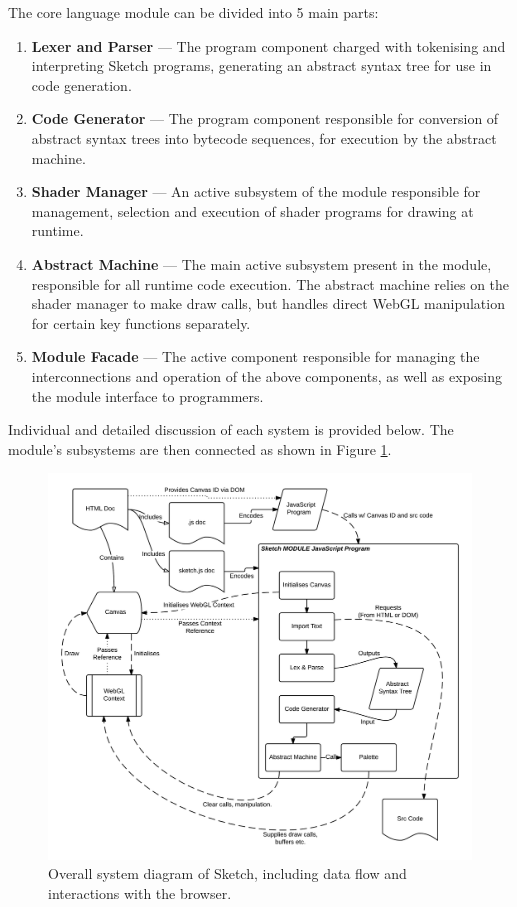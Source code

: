 \documentclass{l3proj}
\begin{document}
The core language module can be divided into 5 main parts:
\begin{enumerate}
\item \textbf{Lexer and Parser} --- The program component charged with tokenising and interpreting Sketch programs, generating an abstract syntax tree for use in code generation.
\item \textbf{Code Generator} --- The program component responsible for conversion of abstract syntax trees into bytecode sequences, for execution by the abstract machine.
\item \textbf{Shader Manager} --- An active subsystem of the module responsible for management, selection and execution of shader programs for drawing at runtime.
\item \textbf{Abstract Machine} --- The main active subsystem present in the module, responsible for all runtime code execution. The abstract machine relies on the shader manager to make draw calls, but handles direct WebGL manipulation for certain key functions separately.
\item \textbf{Module Facade} --- The active component responsible for managing the interconnections and operation of the above components, as well as exposing the module interface to programmers.
\end{enumerate}
Individual and detailed discussion of each system is provided below. The module's subsystems are then connected as shown in Figure \ref{fig:sketch-overall}.
\begin{figure}[!h]
\centering
\includegraphics[width=\textwidth]{images/sys-diag}
\caption{Overall system diagram of Sketch, including data flow and interactions with the browser.}
\label{fig:sketch-overall}
\end{figure}
\end{document}
